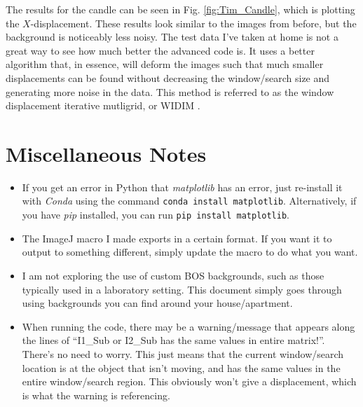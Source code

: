 \documentclass[letterpaper,12pt]{article}
\begin{document}
%    
%

The results for the candle can be seen in Fig. \ref{fig:Tim_Candle}, which is plotting the $X$-displacement.  These results look similar to the images from before, but the background is noticeably less noisy.  The test data I've taken at home is not a great way to see how much better the advanced code is.  It uses a better algorithm that, in essence, will deform the images such that much smaller displacements can be found without decreasing the window/search size and generating more noise in the data.  This method is referred to as the window displacement iterative mutligrid, or WIDIM \cite{2000_Scarano}.

\section{Miscellaneous Notes}
\label{sec:Miscellaneous_Notes}

\begin{itemize}
\item If you get an error in Python that \textit{matplotlib} has an error, just re-install it with \textit{Conda} using the command \texttt{conda install matplotlib}.  Alternatively, if you have \textit{pip} installed, you can run \texttt{pip install matplotlib}.
\item The ImageJ macro I made exports in a certain format.  If you want it to output to something different, simply update the macro to do what you want.
\item I am not exploring the use of custom BOS backgrounds, such as those typically used in a laboratory setting.  This document simply goes through using backgrounds you can find around your house/apartment.
\item When running the code, there may be a warning/message that appears along the lines of ``I1\_Sub or I2\_Sub has the same values in entire matrix!''.  There's no need to worry.  This just means that the current window/search location is at the object that isn't moving, and has the same values in the entire window/search region.  This obviously won't give a displacement, which is what the warning is referencing.
\end{itemize}
\end{document}
